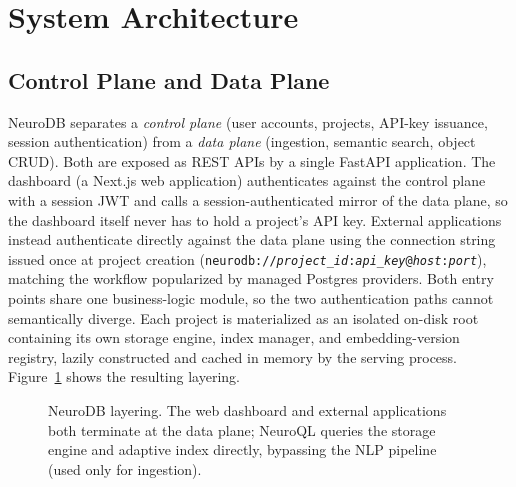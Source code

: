 \documentclass[conference]{IEEEtran}
\begin{document}
\section{System Architecture}

\subsection{Control Plane and Data Plane}

NeuroDB separates a \emph{control plane} (user accounts, projects, API-key issuance, session
authentication) from a \emph{data plane} (ingestion, semantic search, object CRUD). Both are
exposed as REST APIs by a single FastAPI application. The dashboard (a Next.js web
application) authenticates against the control plane with a session JWT and calls a
session-authenticated mirror of the data plane, so the dashboard itself never has to hold a
project's API key. External applications instead authenticate directly against the data
plane using the connection string issued once at project creation
(\texttt{neurodb://\allowbreak\textit{project\_id}:\textit{api\_key}@\textit{host}:\textit{port}}),
matching the workflow popularized by managed Postgres providers. Both entry points share one
business-logic module, so the two authentication paths cannot semantically diverge. Each
project is materialized as an isolated on-disk root containing its own storage engine, index
manager, and embedding-version registry, lazily constructed and cached in memory by the
serving process. Figure~\ref{fig:architecture} shows the resulting layering.

\begin{figure}[t]
\centering
{}
\caption{NeuroDB layering. The web dashboard and external applications both terminate at the
data plane; NeuroQL queries the storage engine and adaptive index directly, bypassing the
NLP pipeline (used only for ingestion).}
\label{fig:architecture}
\end{figure}
\end{document}
